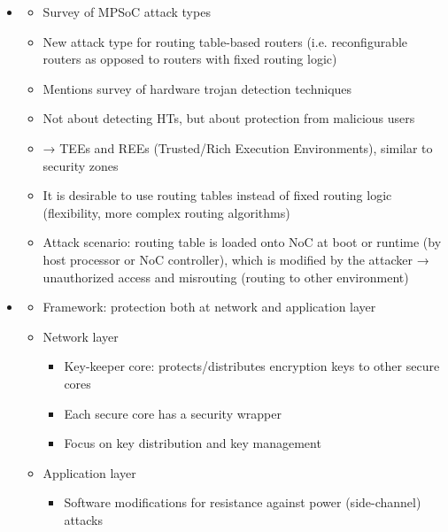 \documentclass[
	paper=a4,
	fontsize=11pt,
	parskip=full %
]{scrreprt}
\begin{document}
\begin{itemize}
\begin{itemize}
            \end{itemize}
        \item \textbf{}
            \begin{itemize}
                \item Survey of MPSoC attack types
                \item New attack type for routing table-based routers (i.e. reconfigurable routers as opposed to routers with fixed routing logic)
                \item Mentions survey of hardware trojan detection techniques
                \item Not about detecting HTs, but about protection from malicious users
                \item → TEEs and REEs (Trusted/Rich Execution Environments), similar to security zones
                \item It is desirable to use routing tables instead of fixed routing logic (flexibility, more complex routing algorithms)
                \item Attack scenario: routing table is loaded onto NoC at boot or runtime (by host processor or NoC controller), which is modified by
                    the attacker → unauthorized access and misrouting (routing to other environment)
            \end{itemize}
        \item \textbf{}
            \begin{itemize}
                \item Framework: protection both at network and application layer
                \item Network layer
                    \begin{itemize}
                        \item Key-keeper core: protects/distributes encryption keys to other secure cores
                        \item Each secure core has a security wrapper
                        \item Focus on key distribution and key management
                    \end{itemize}
                \item Application layer
                    \begin{itemize}
                        \item Software modifications for resistance against power (side-channel) attacks

\end{itemize}
\end{itemize}
\end{itemize}
\end{document}

